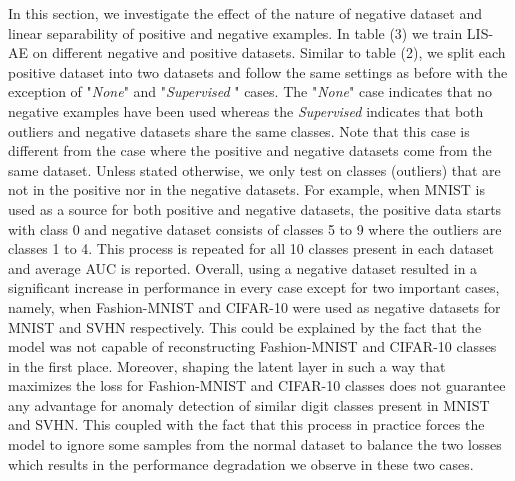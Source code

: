 \documentclass[acmtog, nonacm]{acmart}
\begin{document}
In this section, we investigate the effect of the nature of negative dataset and linear separability of positive and negative examples. In table (3) we train LIS-AE on different negative and positive datasets. Similar to table (2), we split each positive dataset into two datasets and follow the same settings as before with the exception of "\textit{None}" and "\textit{Supervised} " cases. The "\textit{None}" case indicates that no negative examples have been used whereas the \textit{Supervised} indicates that both outliers and negative datasets share the same classes. Note that this case is different from the case where the positive and negative datasets come from the same dataset.
Unless stated otherwise, we only test on classes (outliers) that are not in the positive nor in the negative datasets. For example, when MNIST is used as a source for both positive and negative datasets, the positive data starts with class 0 and negative dataset consists of classes 5 to 9 where the outliers are classes 1 to 4. This process is repeated for all 10 classes present in each dataset and average AUC is reported. Overall, using a negative dataset resulted in a significant increase in performance in every case  except for two important cases, namely, when Fashion-MNIST and CIFAR-10 were used as negative datasets for MNIST and SVHN respectively. This could be explained by the fact that the model was not capable of reconstructing Fashion-MNIST and CIFAR-10 classes in the first place. Moreover, shaping the latent layer in such a way that maximizes the loss for Fashion-MNIST and CIFAR-10 classes does not guarantee any advantage for anomaly detection of similar digit classes present in MNIST and SVHN. This coupled with the fact that this process in practice forces the model to ignore some samples from the normal dataset to balance the two losses which results in the performance degradation we observe in these two cases.
\end{document}

